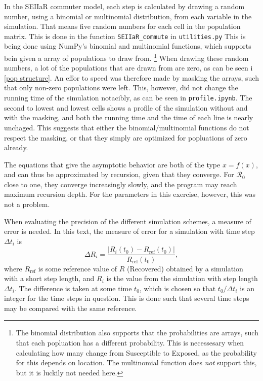 \documentclass{article}
\begin{document}
    In the SEIIaR commuter model, each step is calculated by drawing a random number, using a binomial or multinomial distribution, from each variable in the simulation.
    That means five random numbers for each cell in the population matrix.
    This is done in the function \verb|SEIIaR_commute| in \verb|utilities.py|
    This is being done using NumPy's binomial and multinomial functions, which supports bein given a array of populations to draw from.
    \footnote{The binomial distribution also supports that the probabilities are arrays, such that each popluation has a different probability.
    This is necessesary when calculating how many change from Susceptible to Exposed, as the probability for this depends on location.
    The multinomial function does \emph{not} support this, but it is luckily not needed here.}
    When drawing these random numbers, a lot of the populations that are drawn from are zero, as can be seen i \autoref{pop structure}.
    An effor to speed was therefore made by masking the arrays, such that only non-zero populations were left.
    This, however, did not change the running time of the simulation notacibly, as can be seen in \verb|profile.ipynb|.
    The second to lowest and lowest cells shows a profile of the simulation without and with the masking, and both the running time and the time of each line is nearly unchaged.
    This suggests that either the binomial/multinomial functions do not respect the masking, or that they simply are optimized for popluations of zero already.


    The equations that give the asymptotic behavior are both of the type $x = f(x)$, and can thus be approximated by recursion, given that they converge. 
    For $\mathcal{R}_0$ close to one, they converge increasingly slowly, and the program may reach maximum recursion depth. 
    For the parameters in this exercise, however, this was not a problem.

    When evaluating the precision of the different simulation schemes, a measure of error is needed.
    In this text, the measure of error for a simulation with time step $\Delta t_i$ is
    \begin{equation*}
        \Delta R_i = \frac{|R_i(t_0) - R_{\mathrm{ref}}(t_0)|}{R_{\mathrm{ref}}(t_0)},
    \end{equation*}
    where $R_{\mathrm{ref}}$ is some reference value of $R$ (Recovered) obtained by a simulation with a short step length, and $R_i$ is the value from the simulation with step length $\Delta t_i$.
    The difference is taken at some time $t_0$, which is chosen so that $t_0/\Delta t_i$ is an integer for the time steps in question.
    This is done such that several time steps may be compared with the same reference.
\end{document}
